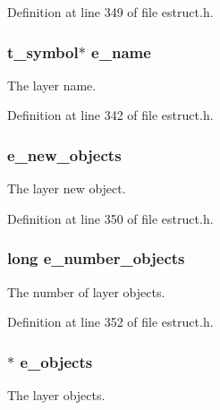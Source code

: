 Definition at line 349 of file estruct.\-h.

\hypertarget{struct__elayer_a6d8c2140844c7949fe9bc0384b2129d8}{
\subsubsection[{e\-\_\-name}]{\setlength{\rightskip}{0pt plus 5cm}t\-\_\-symbol$\ast$ e\-\_\-name}}\label{struct__elayer_a6d8c2140844c7949fe9bc0384b2129d8}
The layer name. 

Definition at line 342 of file estruct.\-h.

\hypertarget{struct__elayer_a793a735e42cff87ab0df8772c76fe039}{
\subsubsection[{e\-\_\-new\-\_\-objects}]{ e\-\_\-new\-\_\-objects}}\label{struct__elayer_a793a735e42cff87ab0df8772c76fe039}
The layer new object. 

Definition at line 350 of file estruct.\-h.

\hypertarget{struct__elayer_ad5b10c31f81ecf9116b72b70b25f9e79}{
\subsubsection[{e\-\_\-number\-\_\-objects}]{\setlength{\rightskip}{0pt plus 5cm}long e\-\_\-number\-\_\-objects}}\label{struct__elayer_ad5b10c31f81ecf9116b72b70b25f9e79}
The number of layer objects. 

Definition at line 352 of file estruct.\-h.

\hypertarget{struct__elayer_a6f0b120b9e9be17af36ba96a368ffccb}{
\subsubsection[{e\-\_\-objects}]{$\ast$ e\-\_\-objects}}\label{struct__elayer_a6f0b120b9e9be17af36ba96a368ffccb}
The layer objects. 

